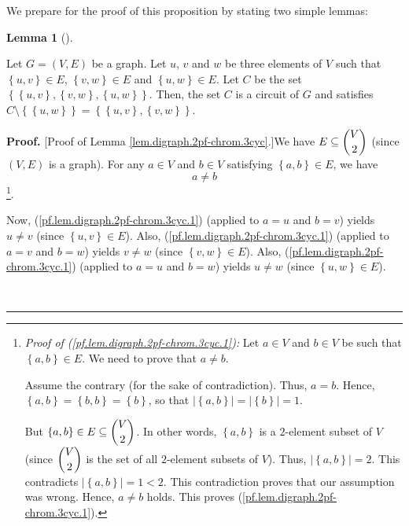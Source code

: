 \documentclass[numbers=enddot,12pt,final,onecolumn,notitlepage]{scrartcl}%
\theoremstyle{definition}
\newtheorem{lem}[theo]{Lemma}
\newenvironment{lemma}[1][]
{\begin{lem}[#1]\begin{leftbar}}
{\end{leftbar}\end{lem}}
\newenvironment{proof}[1][Proof]{\noindent\textbf{#1.} }{\ \rule{0.5em}{0.5em}}
\newenvironment{verlong}{}{}
\begin{document}
\begin{verlong}
We prepare for the proof of this proposition by stating two simple lemmas:

\begin{lemma}
\label{lem.digraph.2pf-chrom.3cyc}Let $G=\left(  V,E\right)  $ be a graph. Let
$u$, $v$ and $w$ be three elements of $V$ such that $\left\{  u,v\right\}  \in
E$, $\left\{  v,w\right\}  \in E$ and $\left\{  u,w\right\}  \in E$. Let $C$
be the set $\left\{  \left\{  u,v\right\}  ,\left\{  v,w\right\}  ,\left\{
u,w\right\}  \right\}  $. Then, the set $C$ is a circuit of $G$ and satisfies
$C\setminus\left\{  \left\{  u,w\right\}  \right\}  =\left\{  \left\{
u,v\right\}  ,\left\{  v,w\right\}  \right\}  $.
\end{lemma}

\begin{proof}
[Proof of Lemma \ref{lem.digraph.2pf-chrom.3cyc}.]We have $E\subseteq
\dbinom{V}{2}$ (since $\left(  V,E\right)  $ is a graph). For any $a\in V$ and
$b\in V$ satisfying $\left\{  a,b\right\}  \in E$, we have%
\begin{equation}
a\neq b \label{pf.lem.digraph.2pf-chrom.3cyc.1}%
\end{equation}
\footnote{\textit{Proof of (\ref{pf.lem.digraph.2pf-chrom.3cyc.1}):} Let $a\in
V$ and $b\in V$ be such that $\left\{  a,b\right\}  \in E$. We need to prove
that $a\neq b$.
\par
Assume the contrary (for the sake of contradiction). Thus, $a=b$. Hence,
$\left\{  a,b\right\}  =\left\{  b,b\right\}  =\left\{  b\right\}  $, so that
$\left\vert \left\{  a,b\right\}  \right\vert =\left\vert \left\{  b\right\}
\right\vert =1$.
\par
But $\left\{  a,b\right\}  \in E\subseteq\dbinom{V}{2}$. In other words,
$\left\{  a,b\right\}  $ is a $2$-element subset of $V$ (since $\dbinom{V}{2}$
is the set of all $2$-element subsets of $V$). Thus, $\left\vert \left\{
a,b\right\}  \right\vert =2$. This contradicts $\left\vert \left\{
a,b\right\}  \right\vert =1<2$. This contradiction proves that our assumption
was wrong. Hence, $a\neq b$ holds. This proves
(\ref{pf.lem.digraph.2pf-chrom.3cyc.1}).}.

Now, (\ref{pf.lem.digraph.2pf-chrom.3cyc.1}) (applied to $a=u$ and $b=v$)
yields $u\neq v$ (since $\left\{  u,v\right\}  \in E$). Also,
(\ref{pf.lem.digraph.2pf-chrom.3cyc.1}) (applied to $a=v$ and $b=w$) yields
$v\neq w$ (since $\left\{  v,w\right\}  \in E$). Also,
(\ref{pf.lem.digraph.2pf-chrom.3cyc.1}) (applied to $a=u$ and $b=w$) yields
$u\neq w$ (since $\left\{  u,w\right\}  \in E$).


\end{proof}
\end{verlong}
\end{document}
